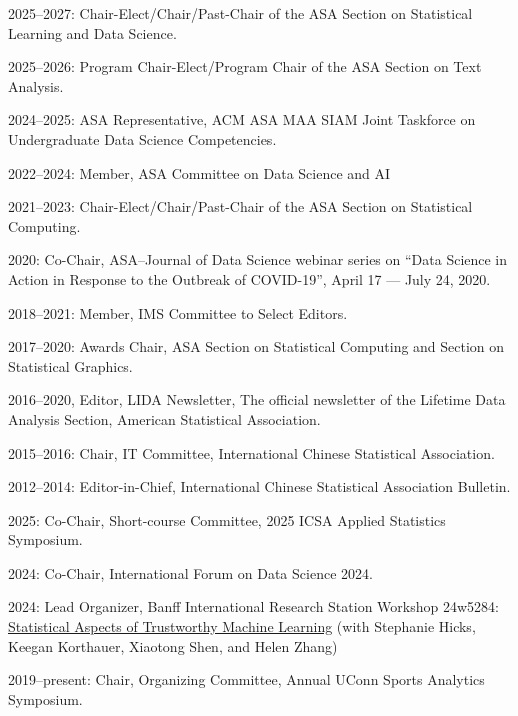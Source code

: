\documentclass[Statistics]{vita}
\begin{document}
\begin{vita}
\begin{Services}
\begin{Editorial}
  \end{Editorial}
  \begin{SocietyService}
  \item 2025--2027: Chair-Elect/Chair/Past-Chair of the ASA Section on Statistical Learning and Data Science.
  \item 2025--2026: Program Chair-Elect/Program Chair of the ASA Section on Text Analysis.
  \item 2024--2025: ASA Representative, ACM ASA MAA SIAM Joint Taskforce on Undergraduate Data Science Competencies.
  \item 2022--2024: Member, ASA Committee on Data Science and AI
  \item 2021--2023: Chair-Elect/Chair/Past-Chair of the ASA Section on Statistical Computing.
  \item 2020: Co-Chair, ASA--Journal of Data Science webinar series on ``Data Science in Action in Response to the Outbreak of COVID-19'', April 17 --- July 24, 2020.
  \item 2018--2021: Member, IMS Committee to Select Editors.
  \item 2017--2020: Awards Chair, ASA Section on Statistical Computing and Section on Statistical Graphics.
  \item 2016--2020, Editor, LIDA Newsletter, The official newsletter of the Lifetime Data Analysis Section, American Statistical Association.
  \item 2015--2016: Chair, IT Committee, International Chinese Statistical Association.
  \item 2012--2014: Editor-in-Chief, International Chinese Statistical Association Bulletin.
  \end{SocietyService}
  \begin{Conferences}
  \item 2025: Co-Chair, Short-course Committee, 2025 ICSA Applied Statistics Symposium.
  \item 2024: Co-Chair, International Forum on Data Science 2024.
  \item 2024: Lead Organizer, Banff International Research Station Workshop 24w5284: \href{http://www.birs.ca/event/24w5284}{Statistical Aspects of Trustworthy Machine Learning} (with Stephanie Hicks, Keegan Korthauer, Xiaotong Shen, and Helen Zhang)
  \item 2019--present: Chair, Organizing Committee, Annual UConn Sports Analytics Symposium.

\end{Conferences}
\end{Services}
\end{vita}
\end{document}
